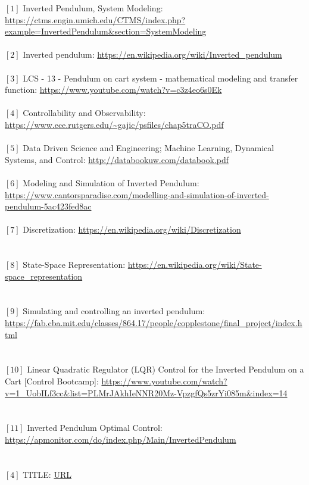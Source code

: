 \documentclass{article}
\begin{document}
\noindent $[1]$ Inverted Pendulum, System Modeling: \url{https://ctms.engin.umich.edu/CTMS/index.php?example=InvertedPendulum&section=SystemModeling}
\\
\vspace{1 mm} \\
$[2]$ Inverted pendulum: \url{https://en.wikipedia.org/wiki/Inverted_pendulum}
\\
\vspace{1 mm} \\
$[3]$ LCS - 13 - Pendulum on cart system - mathematical modeling and transfer function: \url{https://www.youtube.com/watch?v=c3z4eo6s0Ek}
\\
\vspace{1 mm} \\
$[4]$ Controllability and Observability: \url{https://www.ece.rutgers.edu/~gajic/psfiles/chap5traCO.pdf} \\
\\
$[5]$ Data Driven Science and Engineering; Machine Learning, Dynamical Systems, and Control: \url{http://databookuw.com/databook.pdf} \\
\\
$[6]$ Modeling and Simulation of Inverted Pendulum: \url{https://www.cantorsparadise.com/modelling-and-simulation-of-inverted-pendulum-5ac423fed8ac}
\\
\vspace{1 mm} \\
$[7]$ Discretization: \url{https://en.wikipedia.org/wiki/Discretization} \\
\\
\vspace{1 mm} \\
$[8]$ State-Space Representation: \url{https://en.wikipedia.org/wiki/State-space_representation} \\
\\
\vspace{1 mm} \\
$[9]$ Simulating and controlling an inverted pendulum: \url{https://fab.cba.mit.edu/classes/864.17/people/copplestone/final_project/index.html} \\
\\
\vspace{1 mm} \\
$[10]$ Linear Quadratic Regulator (LQR) Control for the Inverted Pendulum on a Cart [Control Bootcamp]: \url{https://www.youtube.com/watch?v=1_UobILf3cc&list=PLMrJAkhIeNNR20Mz-VpzgfQs5zrYi085m&index=14} \\
\\
\vspace{1 mm} \\
$[11]$ Inverted Pendulum Optimal Control: \url{https://apmonitor.com/do/index.php/Main/InvertedPendulum} \\
\\
\vspace{1 mm} \\
$[4]$ TITLE: \url{URL} \\
\end{document}
